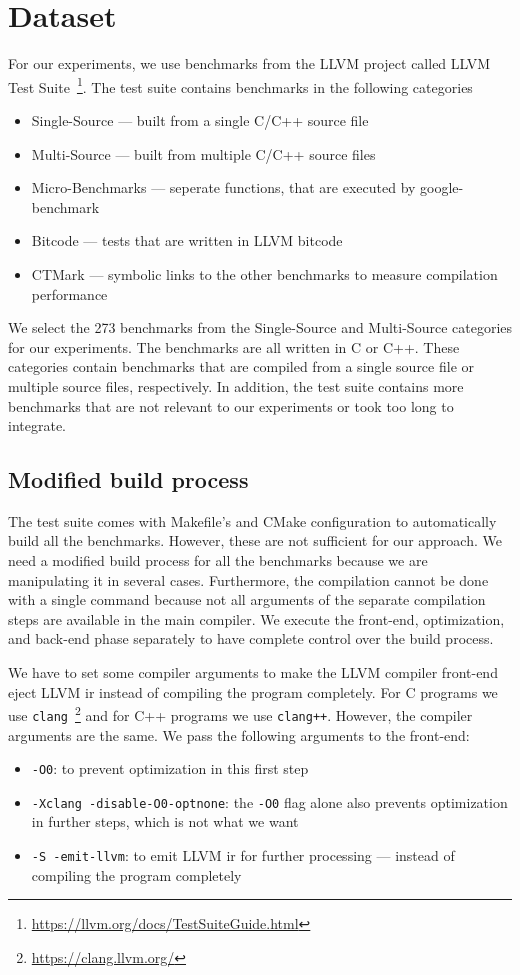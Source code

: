 \section{Dataset}
\label{sec:approach:dataset}
For our experiments, we use benchmarks from the LLVM project called LLVM Test Suite~\footnote{\url{https://llvm.org/docs/TestSuiteGuide.html}}.
The test suite contains benchmarks in the following categories
\begin{itemize}
    \item Single-Source --- built from a single C/C++ source file
    \item Multi-Source --- built from multiple C/C++ source files
    \item Micro-Benchmarks --- seperate functions, that are executed by google-benchmark
    \item Bitcode --- tests that are written in LLVM bitcode
    \item CTMark --- symbolic links to the other benchmarks to measure compilation performance
\end{itemize}
We select the 273 benchmarks from the Single-Source and Multi-Source categories for our experiments.
The benchmarks are all written in C or C++.
These categories contain benchmarks that are compiled from a single source file or multiple source files, respectively.
In addition, the test suite contains more benchmarks that are not relevant to our experiments or took too long to integrate.

\subsection{Modified build process}
The test suite comes with Makefile's and CMake configuration to automatically build all the benchmarks.
However, these are not sufficient for our approach.
We need a modified build process for all the benchmarks because we are manipulating it in several cases.
Furthermore, the compilation cannot be done with a single command because not all arguments of the separate compilation steps are available in the main compiler.
We execute the front-end, optimization, and back-end phase separately to have complete control over the build process.

We have to set some compiler arguments to make the LLVM compiler front-end eject LLVM \ac{ir} instead of compiling the program completely.
For C programs we use \lstinline{clang}~\footnote{\url{https://clang.llvm.org/}} and for C++ programs we use \lstinline{clang++}.
However, the compiler arguments are the same.
We pass the following arguments to the front-end:
\begin{itemize}
    \item \lstinline{-O0}: to prevent optimization in this first step
    \item \lstinline{-Xclang -disable-O0-optnone}: the \lstinline{-O0} flag alone also prevents optimization in further steps, which is not what we want
    \item \lstinline{-S -emit-llvm}: to emit LLVM \ac{ir} for further processing --- instead of compiling the program completely
\end{itemize}

